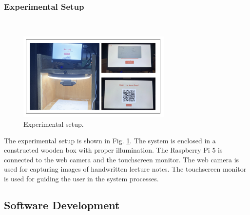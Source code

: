 \documentclass[conference]{IEEEtran}
\begin{document}
        \subsubsection{Experimental Setup}
            \hfill \\
            \vspace{-0.6cm}
            \begin{figure}[H]
                \centerline{\includegraphics[width=3in]{experimental.png}}
                \vspace{-0.3cm}
                \caption{Experimental setup.} 
                \label{experimental}
            \end{figure} 
            \vspace{-0.3cm}
            \indent The experimental setup is shown in 
            Fig. \ref{experimental}. The system is enclosed in a
            constructed wooden box with proper illumination. The
            Raspberry Pi 5 is connected to the web camera and the
            touchscreen monitor. The web camera is used for capturing
            images of handwritten lecture notes. The touchscreen
            monitor is used for guiding the user in the system
            processes.
    \subsection{Software Development}
\end{document}
